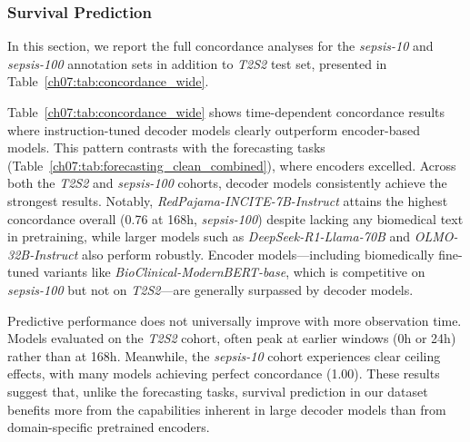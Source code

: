\subsubsection{Survival Prediction}\label{ch07:apd:full_survival}

In this section, we report the full concordance analyses for the \textit{sepsis-10} and \textit{sepsis-100} annotation sets in addition to \textit{T2S2} test set, presented in Table~\ref{ch07:tab:concordance_wide}.

{\raggedright
{}
Table~\ref{ch07:tab:concordance_wide} shows time-dependent concordance results where
instruction-tuned decoder models clearly outperform encoder-based models.
This pattern contrasts with the forecasting tasks (Table~\ref{ch07:tab:forecasting_clean_combined}), where encoders excelled.
Across both the \textit{T2S2} and \textit{sepsis-100} cohorts, decoder models consistently achieve the strongest results.
Notably, \textit{RedPajama-INCITE-7B-Instruct} attains the highest concordance overall (0.76 at 168h, \textit{sepsis-100}) despite lacking any biomedical text in pretraining, while larger models such as \textit{DeepSeek-R1-Llama-70B} and \textit{OLMO-32B-Instruct} also perform robustly.
Encoder models---including biomedically fine-tuned variants like \textit{BioClinical-ModernBERT-base}, which is competitive on \textit{sepsis-100} but not on \textit{T2S2}---are generally surpassed by decoder models.\par}

Predictive performance does not universally improve with more observation time.
Models evaluated on the \textit{T2S2} cohort, often peak at earlier windows (0h or 24h) rather than at 168h.
Meanwhile, the \textit{sepsis-10} cohort experiences clear ceiling effects, with many models achieving perfect concordance (1.00).
These results suggest that, unlike the forecasting tasks, survival prediction in our dataset benefits more from the capabilities inherent in large decoder models than from domain-specific pretrained encoders.


\FloatBarrier
